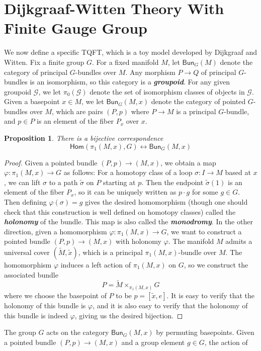 \documentclass[psamsfonts, 11pt]{amsart}
\newtheorem{prop}[thm]{Proposition}
\theoremstyle{definition}
\theoremstyle{remark}
\renewcommand{\hom}{\mathsf{Hom}}
\newcommand{\ib}[1]{\textbf{\textit{#1}}}
\newcommand{\Bun}{\mathsf{Bun}}
\begin{document}
\section{Dijkgraaf-Witten Theory With Finite Gauge Group}
%
We now define a specific TQFT, which is a toy model developed by Dijkgraaf and Witten.
Fix a finite group $G$. For a fixed manifold $M$, let $\Bun_G(M)$ denote the
category of principal $G$-bundles over $M$. Any morphism $P \to Q$ of principal
$G$-bundles is an isomorphism, so this category is a \ib{groupoid}. For any given
groupoid $\mathcal{G}$, we let $\pi_0(\mathcal{G})$ denote the set of isomorphism
classes of objects in $\mathcal{G}$. Given a basepoint
$x \in M$, we let $\Bun_G(M,x)$ denote the category of pointed $G$-bundles over $M$,
which are pairs $(P,p)$ where $P \to M$ is a principal $G$-bundle, and $p\in P$ is
an element of the fiber $P_x$ over $x$.
%
\begin{prop}
There is a bijective correspondence
\[
\hom(\pi_1(M, x), G) \longleftrightarrow \Bun_G(M, x)
\]
\end{prop}
%
\begin{proof}
Given a pointed bundle $(P,p) \to (M,x)$, we obtain a map $\varphi : \pi_1(M,x) \to G$
as follows: For a homotopy class of a loop $\sigma : I \to M$ based at $x$, we
can lift $\sigma$ to a path $\tilde{\sigma}$ on $P$ starting at $p$. Then the endpoint
$\tilde{\sigma}(1)$ is an element of the fiber $P_x$, so it can be uniquely written
as $p \cdot g$ for some $g \in G$. Then defining $\varphi(\sigma) = g$ gives the
desired homomorphism (though one should check that this construction is well defined
on homotopy classes) called the \ib{holonomy} of the bundle. This map is also
called the \ib{monodromy}. In the other direction, given a homomorphism
$\varphi : \pi_1(M,x) \to G$, we want to construct a pointed bundle
$(P,p) \to (M, x)$ with holonomy $\varphi$. The manifold $M$ admits a universal
cover $(\widetilde{M}, \tilde{x})$, which is a principal $\pi_1(M, x)$-bundle over $M$.
The homomorphism $\varphi$ induces a left action of $\pi_1(M, x)$ on $G$, so we
construct the associated bundle
\[
P = \widetilde{M} \times_{\pi_1(M, x)} G
\]
where we choose the basepoint of $P$ to be $p = [\tilde{x}, e]$. It is easy to
verify that the holonomy of this bundle is $\varphi$, and it is also easy to verify
that the holonomy of this bundle is indeed $\varphi$, giving us the desired bijection.
\end{proof}
%
The group $G$ acts on the category $\Bun_G(M,x)$ by permuting basepoints. Given
a pointed bundle $(P, p) \to (M, x)$ and a group element $g \in G$, the action of
\end{document}
